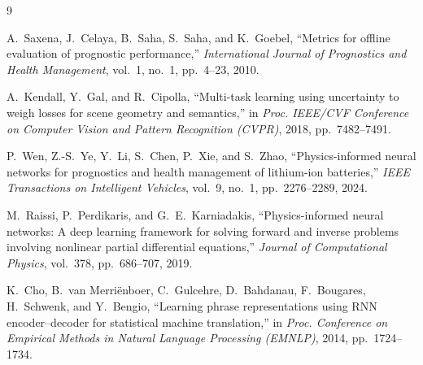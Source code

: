\documentclass[12pt,a4paper]{article}
\begin{document}
\begin{thebibliography}{9}

A.~Saxena, J.~Celaya, B.~Saha, S.~Saha, and K.~Goebel,
``Metrics for offline evaluation of prognostic performance,''
\textit{International Journal of Prognostics and Health Management},
vol.~1, no.~1, pp.~4--23, 2010.

A.~Kendall, Y.~Gal, and R.~Cipolla,
``Multi-task learning using uncertainty to weigh losses for scene geometry and semantics,''
in \textit{Proc. IEEE/CVF Conference on Computer Vision and Pattern Recognition (CVPR)},
2018, pp.~7482--7491.

P.~Wen, Z.-S.~Ye, Y.~Li, S.~Chen, P.~Xie, and S.~Zhao,
``Physics-informed neural networks for prognostics and health management of lithium-ion batteries,''
\textit{IEEE Transactions on Intelligent Vehicles}, vol.~9, no.~1, pp.~2276--2289, 2024.

M.~Raissi, P.~Perdikaris, and G.~E.~Karniadakis,
``Physics-informed neural networks: A deep learning framework for solving forward and inverse problems involving nonlinear partial differential equations,''
\textit{Journal of Computational Physics}, vol.~378, pp.~686--707, 2019.

K.~Cho, B.~van Merri\"enboer, C.~Gulcehre, D.~Bahdanau, F.~Bougares, H.~Schwenk, and Y.~Bengio,
``Learning phrase representations using RNN encoder--decoder for statistical machine translation,''
in \textit{Proc. Conference on Empirical Methods in Natural Language Processing (EMNLP)},
2014, pp.~1724--1734.

\end{thebibliography}
\end{document}
